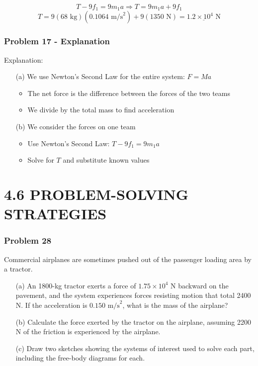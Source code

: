 \documentclass{beamer}
\begin{document}
\begin{}
\begin{frame}
\begin{equation*}
T - 9f_1 = 9m_1a \Rightarrow T = 9m_1a + 9f_1
\end{equation*}
\begin{equation*}
T = 9(68 \text{ kg})(0.1064 \text{ m/s}^2) + 9(1350 \text{ N}) = \underline{1.2 \times 10^{4} \text{ N}}
\end{equation*}
\end{frame}

\begin{frame}
\frametitle{Problem 17 - Explanation}
Explanation:
\begin{itemize}
    \item[(a)] We use Newton's Second Law for the entire system: $F = Ma$
    \begin{itemize}
        \item The net force is the difference between the forces of the two teams
        \item We divide by the total mass to find acceleration
    \end{itemize}
    \item[(b)] We consider the forces on one team
    \begin{itemize}
        \item Use Newton's Second Law: $T - 9f_1 = 9m_1a$
        \item Solve for $T$ and substitute known values
    \end{itemize}
    \end{itemize}
\end{frame}

\section{4.6 PROBLEM-SOLVING STRATEGIES}

\begin{frame}
\frametitle{Problem 28}
Commercial airplanes are sometimes pushed out of the passenger loading area by a tractor.
\begin{itemize}
    \item[(a)] An 1800-kg tractor exerts a force of $1.75 \times 10^{4} \text{ N}$ backward on the pavement, and the system experiences forces resisting motion that total 2400 N. If the acceleration is $0.150 \text{ m/s}^{2}$, what is the mass of the airplane?
    \item[(b)] Calculate the force exerted by the tractor on the airplane, assuming 2200 N of the friction is experienced by the airplane.
    \item[(c)] Draw two sketches showing the systems of interest used to solve each part, including the free-body diagrams for each.
\end{itemize}
\end{frame}


\end{}
\end{document}
